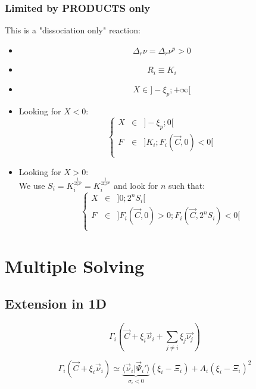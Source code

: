 \documentclass[aps,12pt]{revtex4}
\begin{document}
\subsubsection{Limited by PRODUCTS only}
This is a "dissociation only" reaction:
\begin{itemize}
\item
$$
	\Delta_r \nu =  \Delta_r \nu^p > 0 
$$
\item
$$
	R_i \equiv K_i
$$
\item
$$
	X \in \rbrack -\xi_p; +\infty \lbrack
$$
\item Looking for $X<0$:
$$
 \left\lbrace
 \begin{array}{rcl}
 	X &\in& \rbrack -\xi_p; 0 \lbrack\\
	F &\in& \rbrack K_i; F_i(\vec{C},0)<0 \lbrack\\
\end{array}
\right.
$$
\item Looking for $X>0$:\\
 We use $S_i=K_i^{\frac{1}{\Delta_r \nu}}=K_i^{\frac{1}{\Delta_r \nu^p}}$
 and look for $n$ such that:
 $$
 	\left\lbrace
 \begin{array}{rcl}
 	X &\in& \rbrack 0; 2^n S_i\lbrack\\
	F &\in& \rbrack F_i(\vec{C},0)>0; F_i(\vec{C},2^nS_i)<0 \lbrack\\
\end{array}
\right.
 $$



\end{itemize}
	
	
\section{Multiple Solving}

\subsection{Extension in 1D}

\begin{equation}
	\Gamma_i\left(\vec{C}+\xi_i \vec{\nu}_i + \sum_{j\not=i} \xi_j \vec{\nu_j}\right)
\end{equation}	

\begin{equation}
	\Gamma_i\left(\vec{C}+\xi_i \vec{\nu}_i\right) 
	\simeq 
	\underbrace{\langle \vec{\nu}_i \vert \vec{\Psi}_i' \rangle}_{\sigma_i<0} (\xi_i-\Xi_i) + A_i   (\xi_i-\Xi_i)^2
\end{equation}
\end{document}
